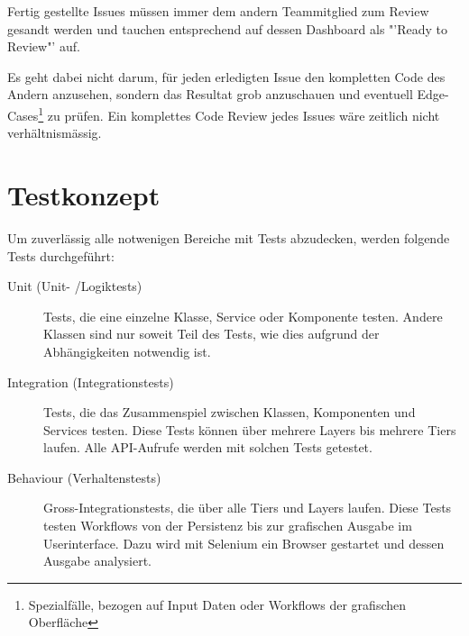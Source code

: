 		Fertig gestellte Issues müssen immer dem andern Teammitglied
		zum Review gesandt werden und tauchen entsprechend auf dessen
		Dashboard als "'Ready to Review"' auf.
		
		Es geht dabei nicht darum, 
		für jeden erledigten Issue den kompletten Code des Andern anzusehen, 
		sondern das Resultat grob anzuschauen und eventuell
		Edge-Cases\footnote{Spezialfälle, bezogen auf Input Daten oder 
		Workflows der grafischen Oberfläche} zu prüfen. 
		Ein komplettes Code Review jedes Issues wäre zeitlich nicht verhältnismässig.
		
		\section{Testkonzept}
		
			Um zuverlässig alle notwenigen Bereiche mit Tests abzudecken, 
			werden folgende Tests durchgeführt:
			
			\begin{description}
				\item[Unit (Unit- /Logiktests)] Tests, die eine einzelne Klasse, 
					Service oder Komponente testen. 
					Andere Klassen sind nur soweit Teil des Tests, 
					wie dies aufgrund der Abhängigkeiten notwendig ist.
				\item[Integration (Integrationstests)] Tests, die das Zusammenspiel zwischen Klassen, 
					Komponenten und Services testen. 
					Diese Tests können über mehrere Layers bis mehrere Tiers laufen.
					Alle API-Aufrufe werden mit solchen Tests getestet.
				\item[Behaviour (Verhaltenstests)] Gross-Integrationstests, 
					die über alle Tiers und Layers laufen. 
					Diese Tests testen Workflows von der Persistenz 
					bis zur grafischen Ausgabe im Userinterface. 
					Dazu wird mit Selenium ein Browser gestartet und dessen Ausgabe analysiert.
			\end{description}
		
	